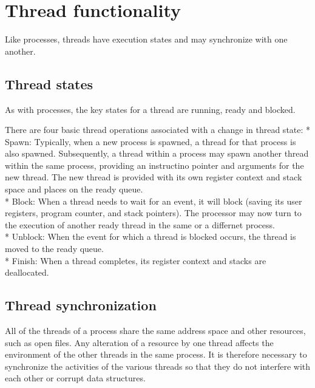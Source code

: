 \section{Thread functionality}

Like processes, threads have execution states and may synchronize with one another. 

\subsection{Thread states}

As with processes, the key states for a thread are running, ready and blocked. 

There are four basic thread operations associated with a change in thread state:
* Spawn: Typically, when a new process is spawned, a thread for that process is also spawned. Subsequently, a thread within a process may spawn another thread within the same process, providing an instructino pointer and arguments for the new thread. The new thread is provided with its own register context and stack space and places on the ready queue.\\
* Block: When a thread needs to wait for an event, it will block (saving its user registers, program counter, and stack pointers). The processor may now turn to the execution of another ready thread in the same or a differnet process.\\
* Unblock: When the event for which a thread is blocked occurs, the thread is moved to the ready queue.\\
* Finish: When a thread completes, its register context and stacks are deallocated.\\

\subsection{Thread synchronization}

All of the threads of a process share the same address space and other resources, such as open files. Any alteration of a resource by one thread affects the environment of the other threads in the same process. It is therefore necessary to synchronize the activities of the various threads so that they do not interfere with each other or corrupt data structures.
